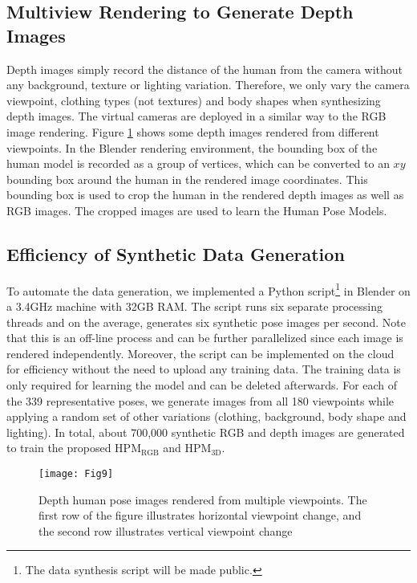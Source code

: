 \documentclass[twocolumn]{svjour3}          \smartqed  \usepackage{graphicx}
\begin{document}
\subsection{Multiview Rendering to Generate Depth Images}

Depth images simply record the distance of the human from the camera without any background, texture or lighting variation. Therefore, we only vary the camera viewpoint, clothing types (not textures) and body shapes when synthesizing depth images. The virtual cameras are deployed in a similar way to the RGB image rendering. Figure \ref{fig:depth_mv_samples} shows some depth images rendered from different viewpoints. In the Blender rendering environment, the bounding box of the human model is recorded as a group of vertices, which can be converted to an $xy$ bounding box around the human in the rendered image  coordinates. This bounding box is used to crop the human in the rendered depth images as well as RGB images. The cropped images are used to learn the Human Pose Models.



\subsection{Efficiency of Synthetic Data Generation}

To automate the data generation, we implemented a Python script\footnote{The data synthesis script will be made public.} in Blender on a 3.4GHz machine with 32GB RAM. The script runs six separate processing threads and on the average, generates six synthetic pose images per second. Note that this is an off-line process and can be further parallelized since each image is rendered independently. Moreover, the script can be implemented on the cloud for efficiency without the need to upload any training data. The training data is only required for learning the model and can be deleted afterwards. For each of the 339 representative poses, we generate images from all 180 viewpoints while applying a random set of other variations (clothing, background, body shape and lighting). In total, about 700,000 synthetic RGB and depth images are generated to train the proposed HPM$_{\mathrm{RGB}}$ and HPM$_{\mathrm{3D}}$.


\begin{figure}[t]
\centering
\texttt{[image: Fig9]}
\caption{Depth human pose images rendered from multiple viewpoints. The first row of the figure illustrates horizontal viewpoint change, and the second row illustrates vertical viewpoint change}
\label{fig:depth_mv_samples}
\vspace{-1mm}
\end{figure}
\end{document}
